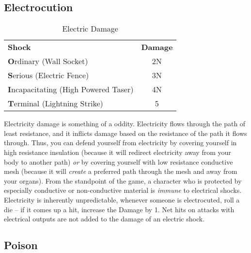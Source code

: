 \subsection{Electrocution}\label{subsection:Electrocution}

\begin{wraptable}[8]{R}{9.1cm}\vspace{-.5cm}
 \caption{Electric Damage} \centering
\begin{tabular}{l c}
\textbf{Shock} & \textbf{Damage} \\
\textbf{O}rdinary (Wall Socket)  & 2N \\
\textbf{S}erious (Electric Fence) & 3N \\
\textbf{I}ncapacitating (High Powered Taser) & 4N \\
\textbf{T}erminal (Lightning Strike)  & 5 \\
\end{tabular}
\end{wraptable}

Electricity damage is something of a oddity. Electricity flows through the path of least resistance, and it inflicts damage based on the resistance of the path it flows through. Thus, you can defend yourself from electricity by covering yourself in high resistance insulation (because it will redirect electricity away from your body to another path) \textit{or} by covering yourself with low resistance conductive mesh (because it will \textit{create} a preferred path through the mesh and away from your organs). From the standpoint of the game, a character who is protected by especially conductive or non-conductive material is \textit{immune} to electrical shocks. Electricity is inherently unpredictable, whenever someone is electrocuted, roll a die -- if it comes up a hit, increase the Damage by 1. Net hits on attacks with electrical outputs are not added to the damage of an electric shock.

\subsection{Poison}\label{subsection:Poison}

